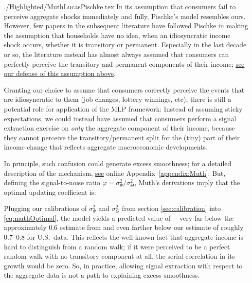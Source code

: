 \documentclass[titlepage]{\econtex}
\begin{document}
\begin{verbatimwrite}{./Highlighted/MuthLucasPischke.tex}
In its assumption that consumers fail to perceive aggregate shocks immediately and fully, Pischke's model resembles ours.  However, few papers in the subsequent literature have followed Pischke in making the assumption that households have no idea, when an idiosyncratic income shock occurs, whether it is transitory or permanent.  Especially in the last decade or so, the literature instead has almost always assumed that consumers can perfectly perceive the transitory and permanent components of their income; \hyperlink{Why-Consumers-See-Individual-Shocks}{see our defense of this assumption above}.

Granting our choice to assume that consumers correctly perceive the events that are idiosyncratic to them (job changes, lottery winnings, etc), there is still a potential role for application of the MLP framework:  Instead of assuming sticky expectations, we could instead have assumed that consumers perform a signal extraction exercise on \textit{only} the aggregate component of their income, because they cannot perceive the transitory/permanent split for the (tiny) part of their income change that reflects aggregate macroeconomic developments.

In principle, such confusion could generate excess smoothness; for a detailed description of the mechanism, \hyperlink{MuthLucasPischke}{see} online Appendix~\ref{appendix:Muth}.  But, defining the signal-to-noise ratio $\varphi=\sigma^2_{\Psi}/\sigma^2_{\Theta}$, Muth's derivations imply that the optimal updating coefficient is:
 
\providecommand{\PischkePi}{0.83}
\providecommand{\PischkePiCancel}{0.17}
 \providecommand{\fromFile}{false}
 \providecommand{\FileOrNot}{\ifthenelse{\boolean{\fromFile}}}
Plugging our calibrations of $\sigma^2_{\Psi}$ and $\sigma^2_{\Theta}$ from section \ref{sec:calibration} into \eqref{eq:muthOptimal}, the model yields a predicted value of \FileOrNot{$1-\Pi \approx \PischkePiCancel$}{$(1-\Pi) \approx \PischkePiCancel $}---very far below the approximately $0.6$ estimate from \cite{hrsHabit} and even farther below our estimate of roughly $0.7$--$0.8$ for U.S.\ data.  This reflects the well-known fact that aggregate income is hard to distinguish from a random walk; if it were perceived to be a perfect random walk with no transitory component at all, the serial correlation in its growth would be zero.  So, in practice, allowing signal extraction with respect to the aggregate data is not a path to explaining excess smoothness.

\subsection{\cite{reis:inattentive}}


\end{verbatimwrite}
\end{document}
